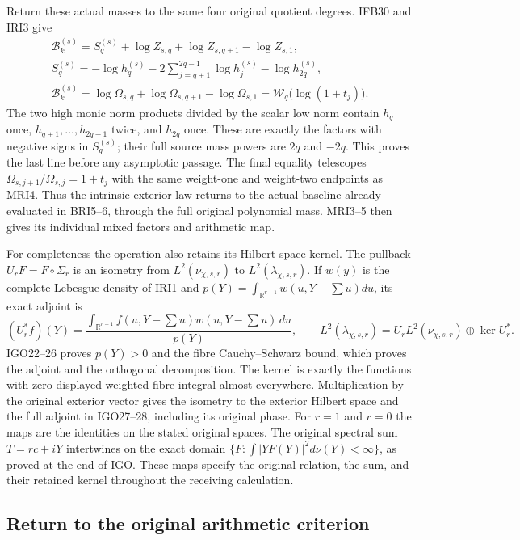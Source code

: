 Return these actual masses to the same four original quotient
degrees. IFB30 and IRI3 give
\[
\begin{gathered}
 \mathcal B_k^{(s)}
   =S_q^{(s)}+\log Z_{s,q}+\log Z_{s,q+1}-\log Z_{s,1},\\
 S_q^{(s)}=-\log h_q^{(s)}
       -2\sum_{j=q+1}^{2q-1}\log h_j^{(s)}-\log h_{2q}^{(s)},\\
 \mathcal B_k^{(s)}
   =\log\Omega_{s,q}+\log\Omega_{s,q+1}-\log\Omega_{s,1}
   =\mathcal W_q\bigl(\log(1+t_j)\bigr).
\end{gathered}\tag{IRI4}
\]
The two high monic norm products divided by the scalar low norm
contain $h_q$ once, $h_{q+1},\ldots,h_{2q-1}$ twice, and
$h_{2q}$ once. These are exactly the factors with negative signs
in $S_q^{(s)}$; their full source mass powers are $2q$ and $-2q$.
This proves the last line before any asymptotic passage. The final
equality telescopes $\Omega_{s,j+1}/\Omega_{s,j}=1+t_j$ with
the same weight-one and weight-two endpoints as MRI4. Thus the
intrinsic exterior law returns to the actual baseline already
evaluated in BRI5--6, through the full original polynomial mass.
MRI3--5 then gives its individual mixed factors and arithmetic map.

For completeness the operation also retains its Hilbert-space
kernel. The pullback $U_rF=F\circ\Sigma_r$ is an isometry from
$L^2(\nu_{\chi,s,r})$ to $L^2(\lambda_{\chi,s,r})$. If
$w(y)$ is the complete Lebesgue density of IRI1 and
$p(Y)=\int_{\mathbb R^{r-1}}w(u,Y-\sum u)du$, its exact adjoint is
\[
 (U_r^*f)(Y)=\frac{\int_{\mathbb R^{r-1}}
                 f(u,Y-\sum u)w(u,Y-\sum u)\,du}{p(Y)},
 \qquad
 L^2(\lambda_{\chi,s,r})
       =U_rL^2(\nu_{\chi,s,r})\oplus\ker U_r^*.
 \tag{IRI5}
\]
IGO22--26 proves $p(Y)>0$ and the fibre Cauchy--Schwarz bound,
which proves the adjoint and the orthogonal decomposition. The
kernel is exactly the functions with zero displayed weighted fibre
integral almost everywhere. Multiplication by the original exterior
vector gives the isometry to the exterior Hilbert space and the
full adjoint in IGO27--28, including its original phase. For $r=1$
and $r=0$ the maps are the identities on the stated original spaces.
The original spectral sum $T=rc+iY$ intertwines on the exact domain
$\{F:\int |YF(Y)|^2d\nu(Y)<\infty\}$, as proved at the end of IGO.
These maps specify the original relation, the sum, and their retained
kernel throughout the receiving calculation.

\subsection{Return to the original arithmetic criterion}